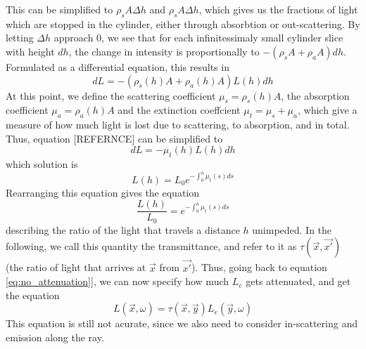 This can be simplified to ${\rho}_sA{\Delta}h$ and ${\rho}_sA{\Delta}h$, which gives us the fractions of light which are stopped in the cylinder, either through absorbtion or out-scattering. By letting $\Delta h$ approach 0, we see that for each infinitessimaly small cylinder slice with height $dh$, the change in intensity is proportionally to $-({\rho}_sA + {\rho}_aA)dh$.
Formulated as a differential equation, this results in
\begin{equation}
dL = -({\rho}_s(h)A + {\rho}_a(h)A)L(h)dh
\end{equation}
At this point, we define the scattering coefficient ${\mu}_s ={\rho}_s(h)A $, the absorption coefficient ${\mu}_a = {\rho}_a(h)A$ and the extinction coeffcient ${\mu}_t = {\mu}_s +{\mu}_a$, which give a measure of how much light is lost due to scattering, to absorption, and in total. Thus, equation [REFERNCE] can be simplified to
\begin{equation}
dL = - {\mu}_t(h)L(h)dh
\end{equation}
which solution is
\begin{equation}
L(h) = L_0e^{-\int_{0}^{h} {\mu}_t(s)ds}
\end{equation}
Rearranging this equation gives the equation
\begin{equation}
\frac{L(h)}{L_0} = e^{-\int_{0}^{h} {\mu}_t(s)ds}
\end{equation}
describing the ratio of the light that travels a distance $h$ unimpeded. In the following, we call this quantity the transmittance, and refer to it as $\tau(\vec{x}, \vec{x'})$ (the ratio of light that arrives at $\vec{x}$ from $\vec{x'}$).
Thus, going back to equation \ref{eq:no_attenuation}], we can now specify how much $L_e$ gets attenuated, and get the equation
\begin{equation}
L(\vec{x},\omega ) =\tau(\vec{x}, \vec{y}) L_e(\vec{y}, \omega )
\end{equation}
This equation is still not acurate, since we also need to consider in-scattering and emission along the ray.
